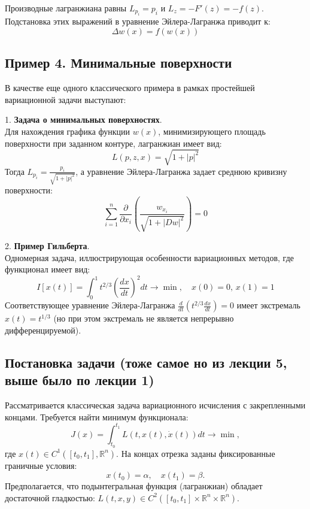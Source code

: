 Производные лагранжиана равны $L_{p_i} = p_i$ и $L_z = -F'(z) = -f(z)$. 
Подстановка этих выражений в уравнение Эйлера-Лагранжа приводит к:
\begin{equation}
    \Delta w(x) = f(w(x))
\end{equation}

\subsection{Пример 4. Минимальные поверхности}
В качестве еще одного классического примера в рамках простейшей вариационной 
задачи выступают:

1. \textbf{Задача о минимальных поверхностях}. \\
Для нахождения графика функции $w(x)$, минимизирующего площадь поверхности 
при заданном контуре, лагранжиан имеет вид:
\begin{equation}
    L(p,z,x) = \sqrt{1 + |p|^2}
\end{equation}
Тогда $L_{p_i} = \frac{p_i}{\sqrt{1+|p|^2}}$, 
а уравнение Эйлера-Лагранжа задает среднюю кривизну поверхности:
\begin{equation}
    \sum_{i=1}^n \frac{\partial}{\partial x_i} \left( \frac{w_{x_i}}{\sqrt{1 + |Dw|^2}} \right) = 0
\end{equation}

2. \textbf{Пример Гильберта}. \\
Одномерная задача, иллюстрирующая особенности вариационных методов, 
где функционал имеет вид:
\begin{equation}
    I[x(t)] = \int_0^1 t^{2/3} \left( \frac{dx}{dt} \right)^2 dt 
    \rightarrow \min, \quad x(0)=0, \, x(1)=1
\end{equation}
Соответствующее уравнение Эйлера-Лагранжа 
$\frac{d}{dt}\left( t^{2/3} \frac{dx}{dt} \right) = 0$ 
имеет экстремаль $\hat{x}(t) = t^{1/3}$ 
(но при этом экстремаль не является непрерывно дифференцируемой).

\subsection{Постановка задачи (тоже самое но из лекции 5, выше было по лекции 1)}
Рассматривается классическая задача вариационного исчисления с закрепленными концами. Требуется найти минимум функционала:
\begin{equation}
    J(x) = \int_{t_0}^{t_1} L(t, x(t), \dot{x}(t)) dt \rightarrow \min,
\end{equation}
где $x(t) \in C^1([t_0, t_1], \mathbb{R}^n)$.
На концах отрезка заданы фиксированные граничные условия: 
\begin{equation}
    x(t_0) = \alpha, \quad x(t_1) = \beta.
\end{equation}
Предполагается, что подынтегральная функция (лагранжиан) обладает достаточной гладкостью: $L(t, x, y) \in C^2([t_0, t_1] \times \mathbb{R}^n \times \mathbb{R}^n)$.

